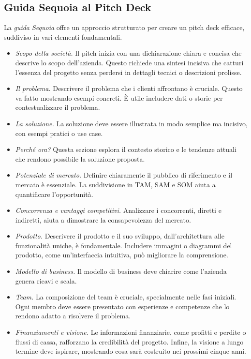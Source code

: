 \subsection{Guida Sequoia al Pitch Deck}
La \textit{guida Sequoia} offre un approccio strutturato per creare un pitch deck efficace, suddiviso in vari elementi fondamentali.
\begin{itemize}
    \item \textit{Scopo della società.} Il pitch inizia con una dichiarazione chiara e concisa che descrive lo scopo dell’azienda. Questo richiede una sintesi incisiva che catturi l’essenza del progetto senza perdersi in dettagli tecnici o descrizioni prolisse.
    \item \textit{Il problema.} Descrivere il problema che i clienti affrontano è cruciale. Questo va fatto mostrando esempi concreti. È utile includere dati o storie per contestualizzare il problema.
    \item \textit{La soluzione.} La soluzione deve essere illustrata in modo semplice ma incisivo, con esempi pratici o use case.
    \item \textit{Perché ora?} Questa sezione esplora il contesto storico e le tendenze attuali che rendono possibile la soluzione proposta.
    \item \textit{Potenziale di mercato.} Definire chiaramente il pubblico di riferimento e il mercato è essenziale. La suddivisione in TAM, SAM e SOM aiuta a quantificare l’opportunità.
    \item \textit{Concorrenza e vantaggi competitivi.} Analizzare i concorrenti, diretti e indiretti, aiuta a dimostrare la consapevolezza del mercato.
    \item \textit{Prodotto.} Descrivere il prodotto e il suo sviluppo, dall’architettura alle funzionalità uniche, è fondamentale. Includere immagini o diagrammi del prodotto, come un’interfaccia intuitiva, può migliorare la comprensione.
    \item \textit{Modello di business.} Il modello di business deve chiarire come l’azienda genera ricavi e scala.
    \item \textit{Team.} La composizione del team è cruciale, specialmente nelle fasi iniziali. Ogni membro deve essere presentato con esperienze e competenze che lo rendono adatto a risolvere il problema.
    \item \textit{Finanziamenti e visione.} Le informazioni finanziarie, come profitti e perdite o flussi di cassa, rafforzano la credibilità del progetto. Infine, la visione a lungo termine deve ispirare, mostrando cosa sarà costruito nei prossimi cinque anni.
\end{itemize}

